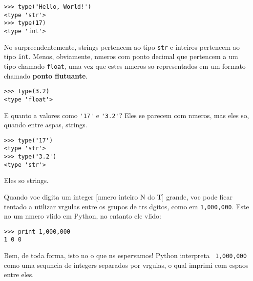 \beforeverb
\begin{verbatim}
>>> type('Hello, World!')
<type 'str'>
>>> type(17)
<type 'int'>
\end{verbatim}
\afterverb
% 
N o surpreendentemente, strings pertencem ao tipo {\tt str} e 
inteiros pertencem ao tipo {\tt int}. Menos, obviamente, n meros 
com ponto decimal que pertencem a um tipo chamado {\tt float},
uma vez que estes n meros s o representados em um formato 
chamado {\bf ponto flutuante}.


\beforeverb
\begin{verbatim}
>>> type(3.2)
<type 'float'>
\end{verbatim}
\afterverb
%
E quanto a valores como \verb"'17'" e \verb"'3.2'"?
Eles se parecem com n meros, mas eles s o, quando entre aspas, 
strings.


\beforeverb
\begin{verbatim}
>>> type('17')
<type 'str'>
>>> type('3.2')
<type 'str'>
\end{verbatim}
\afterverb
%
Eles s o strings.

Quando voc  digita um integer [n mero inteiro   N do T] grande, voc  pode ficar tentado a utilizar v rgulas 
entre os grupos de tr s d gitos, como em {\tt 1,000,000}. Este n o   um 
n mero v lido em Python, no entanto ele   v lido:

\beforeverb
\begin{verbatim}
>>> print 1,000,000
1 0 0
\end{verbatim}
\afterverb
%

Bem, de toda forma, isto n o   o que n s esper vamos!  Python interpreta {\tt
  1,000,000} como  uma sequ ncia de integers separados por v rgulas, o qual 
imprimi com espa os entre eles.

